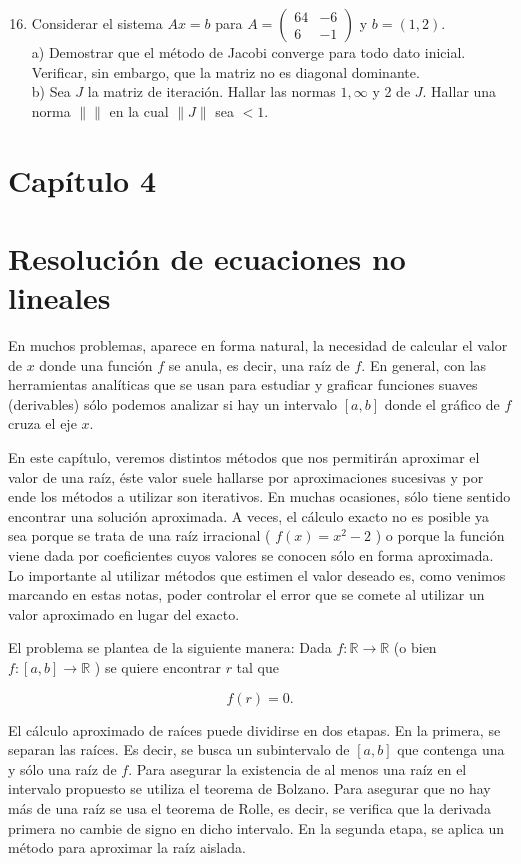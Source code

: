 \documentclass[10pt]{article}
\begin{document}
\begin{enumerate}
  \setcounter{enumi}{15}
  \item Considerar el sistema $A x=b$ para $A=\left(\begin{array}{cc}64 & -6 \\ 6 & -1\end{array}\right)$ y $b=(1,2)$.\\
a) Demostrar que el método de Jacobi converge para todo dato inicial. Verificar, sin embargo, que la matriz no es diagonal dominante.\\
b) Sea $J$ la matriz de iteración. Hallar las normas $1, \infty$ y 2 de $J$. Hallar una norma $\|\|$ en la cual $\|J\|$ sea $<1$.
\end{enumerate}

\section*{Capítulo 4}
\section*{Resolución de ecuaciones no lineales}
En muchos problemas, aparece en forma natural, la necesidad de calcular el valor de $x$ donde una función $f$ se anula, es decir, una raíz de $f$. En general, con las herramientas analíticas que se usan para estudiar y graficar funciones suaves (derivables) sólo podemos analizar si hay un intervalo $[a, b]$ donde el gráfico de $f$ cruza el eje $x$.

En este capítulo, veremos distintos métodos que nos permitirán aproximar el valor de una raíz, éste valor suele hallarse por aproximaciones sucesivas y por ende los métodos a utilizar son iterativos. En muchas ocasiones, sólo tiene sentido encontrar una solución aproximada. A veces, el cálculo exacto no es posible ya sea porque se trata de una raíz irracional ( $f(x)=x^{2}-2$ ) o porque la función viene dada por coeficientes cuyos valores se conocen sólo en forma aproximada. Lo importante al utilizar métodos que estimen el valor deseado es, como venimos marcando en estas notas, poder controlar el error que se comete al utilizar un valor aproximado en lugar del exacto.

El problema se plantea de la siguiente manera: Dada $f: \mathbb{R} \rightarrow \mathbb{R}$ (o bien $f:[a, b] \rightarrow \mathbb{R}$ ) se quiere encontrar $r$ tal que

$$
f(r)=0 .
$$

El cálculo aproximado de raíces puede dividirse en dos etapas. En la primera, se separan las raíces. Es decir, se busca un subintervalo de $[a, b]$ que contenga una y sólo una raíz de $f$. Para asegurar la existencia de al menos una raíz en el intervalo propuesto se utiliza el teorema de Bolzano. Para asegurar que no hay más de una raíz se usa el teorema de Rolle, es decir, se verifica que la derivada primera no cambie de signo en dicho intervalo. En la segunda etapa, se aplica un método para aproximar la raíz aislada.
\end{document}
